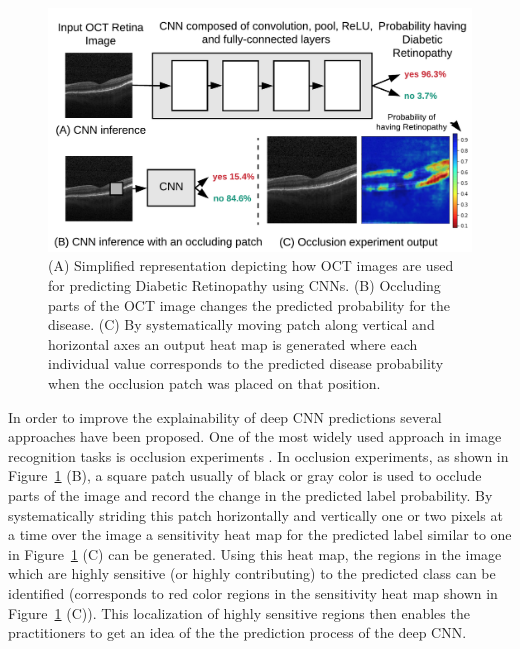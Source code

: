 \begin{figure}[t]
  \includegraphics[width=\columnwidth]{./images/krypton_overview}
  \caption{(A) Simplified representation depicting how OCT images are used for predicting Diabetic Retinopathy using CNNs. (B) Occluding parts of the OCT image changes the predicted probability for the disease. (C) By systematically moving patch along vertical and horizontal axes an output heat map is generated where each individual value corresponds to the predicted disease probability when the occlusion patch was placed on that position.}
  \label{fig:krypton_overview}
\end{figure}

In order to improve the explainability of deep CNN predictions several approaches have been proposed.
One of the most widely used approach in image recognition tasks is occlusion experiments \cite{zeiler2014visualizing}.
In occlusion experiments, as shown in Figure~\ref{fig:krypton_overview} (B), a square patch usually of black or gray color is used to occlude parts of the image and record the change in the predicted label probability.
By systematically striding this patch horizontally and vertically one or two pixels at a time over the image a sensitivity heat map for the predicted label similar to one in Figure~\ref{fig:krypton_overview} (C) can be generated.
Using this heat map, the regions in the image which are highly sensitive (or highly contributing) to the predicted class can be identified (corresponds to red color regions in the sensitivity heat map shown in Figure~\ref{fig:krypton_overview} (C)).
This localization of highly sensitive regions then enables the practitioners to get an idea of the the prediction process of the deep CNN.

